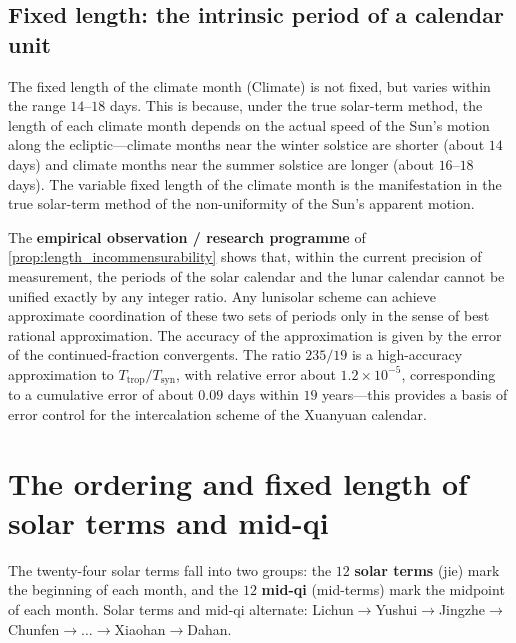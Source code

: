\subsection{Fixed length: the intrinsic period of a calendar unit}

\begin{remark}\label{rem:climate_fixed_length}
The fixed length of the climate month (Climate) is not fixed, but varies within the range \(14\)--\(18\) days. This is because, under the true solar-term method, the length of each climate month depends on the actual speed of the Sun's motion along the ecliptic---climate months near the winter solstice are shorter (about \(14\) days) and climate months near the summer solstice are longer (about \(16\)--\(18\) days). The variable fixed length of the climate month is the manifestation in the true solar-term method of the non-uniformity of the Sun's apparent motion.
\end{remark}

\begin{remark}\label{rem:incommensurability_meaning}
The \textbf{empirical observation / research programme} of \cref{prop:length_incommensurability} shows that, within the current precision of measurement, the periods of the solar calendar and the lunar calendar cannot be unified exactly by any integer ratio. Any lunisolar scheme can achieve approximate coordination of these two sets of periods only in the sense of best rational approximation. The accuracy of the approximation is given by the error of the continued-fraction convergents. The ratio \(235/19\) is a high-accuracy approximation to \(T_{\text{trop}}/T_{\text{syn}}\), with relative error about \(1.2\times 10^{-5}\), corresponding to a cumulative error of about \(0.09\) days within \(19\) years---this provides a basis of error control for the intercalation scheme of the Xuanyuan calendar.
\end{remark}

\section{The ordering and fixed length of solar terms and mid-qi}
\label{sec:jieqi_zhongqi}

\begin{definition}\label{def:jieqi_zhongqi}
The twenty-four solar terms fall into two groups: the \(12\) \textbf{solar terms} (jie) mark the beginning of each month, and the \(12\) \textbf{mid-qi} (mid-terms) mark the midpoint of each month. Solar terms and mid-qi alternate: Lichun$\to$Yushui$\to$Jingzhe$\to$Chunfen$\to\dots\to$Xiaohan$\to$Dahan.
\end{definition}

